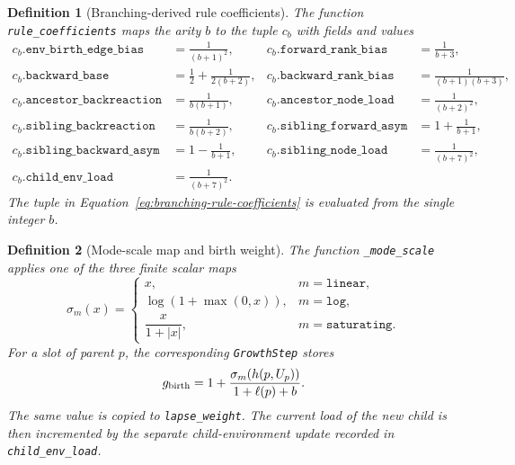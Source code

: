 \documentclass[11pt]{article}
\newtheorem{definition}{Definition}[section]
\theoremstyle{remark}
\newcommand{\code}[1]{\texttt{#1}}
\numberwithin{equation}{section}
\begin{document}
\begin{definition}[Branching-derived rule coefficients]
The function \code{rule\_coefficients} maps the arity $b$ to the tuple $c_b$ with fields and values
\begin{equation}
\begin{aligned}
  c_b.\code{env\_birth\_edge\_bias} &= \frac{1}{(b+1)^2}, &
  c_b.\code{forward\_rank\_bias} &= \frac{1}{b+3},\\
  c_b.\code{backward\_base} &= \frac12+\frac{1}{2(b+2)}, &
  c_b.\code{backward\_rank\_bias} &= \frac{1}{(b+1)(b+3)},\\
  c_b.\code{ancestor\_backreaction} &= \frac{1}{b(b+1)}, &
  c_b.\code{ancestor\_node\_load} &= \frac{1}{(b+2)^2},\\
  c_b.\code{sibling\_backreaction} &= \frac{1}{b(b+2)}, &
  c_b.\code{sibling\_forward\_asym} &= 1+\frac{1}{b+1},\\
  c_b.\code{sibling\_backward\_asym} &= 1-\frac{1}{b+1}, &
  c_b.\code{sibling\_node\_load} &= \frac{1}{(b+7)^2},\\
  c_b.\code{child\_env\_load} &= \frac{1}{(b+7)^2}.&&
\end{aligned}
\label{eq:branching-rule-coefficients}
\end{equation}
The tuple in Equation~\eqref{eq:branching-rule-coefficients} is evaluated from the single integer $b$.
\end{definition}

\begin{definition}[Mode-scale map and birth weight]
The function \code{\_mode\_scale} applies one of the three finite scalar maps
\begin{equation}
  \sigma_m(x)=
  \begin{cases}
    x, & m=\code{linear},\\
    \log(1+\max(0,x)), & m=\code{log},\\
    \dfrac{x}{1+|x|}, & m=\code{saturating}.
  \end{cases}
  \label{eq:mode-scale-map}
\end{equation}
For a slot of parent $p$, the corresponding \code{GrowthStep} stores
\begin{equation}
  g_{\rm birth}=1+\frac{\sigma_m(h(p,U_p))}{1+\ell(p)+b}.
  \label{eq:birth-weight}
\end{equation}
The same value is copied to \code{lapse\_weight}. The current load of the new child is then incremented by the separate child-environment update recorded in \code{child\_env\_load}.
\end{definition}
\end{document}
